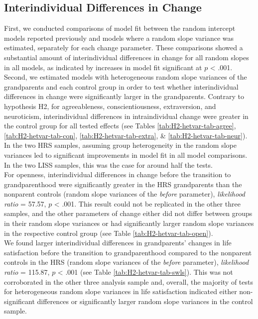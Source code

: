 \documentclass[
  english,
  man,floatsintext]{apa7}
\begin{document}
\hypertarget{interindividual-differences-in-change}{%
\subsection{Interindividual Differences in Change}\label{interindividual-differences-in-change}}

First, we conducted comparisons of model fit between the random intercept models reported previously and models where a random slope variance was estimated, separately for each change parameter. These comparisons showed a substantial amount of interindividual differences in change for all random slopes in all models, as indicated by increases in model fit significant at \(p\) \textless{} .001.\\
Second, we estimated models with heterogeneous random slope variances of the grandparents and each control group in order to test whether interindividual differences in change were significantly larger in the grandparents. Contrary to hypothesis H2, for agreeableness, conscientiousness, extraversion, and neuroticism, interindividual differences in intraindividual change were greater in the control group for all tested effects (see Tables \ref{tab:H2-hetvar-tab-agree}, \ref{tab:H2-hetvar-tab-con}, \ref{tab:H2-hetvar-tab-extra}, \& \ref{tab:H2-hetvar-tab-neur}). In the two HRS samples, assuming group heterogeneity in the random slope variances led to significant improvements in model fit in all model comparisons. In the two LISS samples, this was the case for around half the tests.\\
For openness, interindividual differences in change before the transition to grandparenthood were significantly greater in the HRS grandparents than the nonparent controls (random slope variances of the \emph{before} parameter), \emph{likelihood ratio} = 57.57, \(p\) \textless{} .001. This result could not be replicated in the other three samples, and the other parameters of change either did not differ between groups in their random slope variances or had significantly larger random slope variances in the respective control group (see Table \ref{tab:H2-hetvar-tab-open}).\\
We found larger interindividual differences in grandparents' changes in life satisfaction before the transition to grandparenthood compared to the nonparent controls in the HRS (random slope variances of the \emph{before} parameter), \emph{likelihood ratio} = 115.87, \(p\) \textless{} .001 (see Table \ref{tab:H2-hetvar-tab-swls}). This was not corroborated in the other three analysis sample and, overall, the majority of tests for heterogeneous random slope variances in life satisfaction indicated either non-significant differences or significantly larger random slope variances in the control sample.
\end{document}
